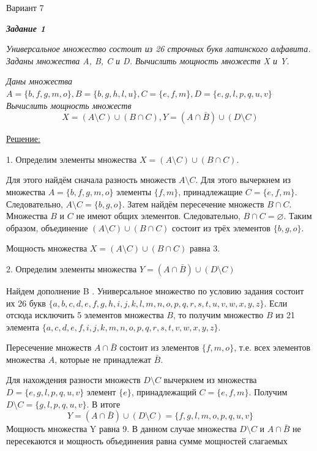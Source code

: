 \documentclass[11pt]{article}
\let\emptyset\varnothing
\begin{document}
        \begin{center}
        Вариант 7
        \end{center}

        \textit{\textbf{Задание 1}}

        \textit{Универсальное множество состоит из 26 строчных букв латинского
алфавита. Заданы множества A, B, C и D. Вычислить мощность множеств X
и Y.}

\textit{Даны множества
$A=\{b,f,g,m,o\}, B=\{b,g,h,l,u\}, C=\{e,f,m\}, D=\{e,g,l,p,q,u,v\}$\\
Вычислить мощность множеств}
$$X = (A \setminus C) \cup (B \cap C),
Y=(A \cap \bar B) \cup (D \setminus C) $$

\underline{Решение:}

1. Определим элементы множества 
$X = (A \setminus C) \cup (B \cap C)$.

Для этого найдём сначала разность множеств $A \setminus C$.
Для этого вычеркнем из множества $A=\{b,f,g,m,o\}$ элементы
$\{f, m\}$, принадлежащие $C=\{e,f,m\}$. Следовательно,
$A \setminus C = \{b, g, o\}$.
Затем найдём пересечение множеств $B \cap C$.
Множества $B$ и $C$ не имеют общих элементов. Следовательно,
$B \cap C = \emptyset$.
Таким образом, объединение $(A \setminus C) \cup (B \cap C)$ состоит из
трёх элементов $\{b, g, o\}$.

Мощность множества 
$X = (A \setminus C) \cup (B \cap C)$ равна 3.

2. Определим элементы множества 
$Y=(A \cap \bar B) \cup (D \setminus C)$

Найдем дополнение B . Универсальное множество по условию задания
состоит их 26 букв
$\{a,b,c,d,e,f,g,h,i,j,k,l,m,n,o,p,q,r,s,t,u,v,w,x,y,z\}$.
Если отсюда исключить 5 элементов множества $B$, то получим множество
$B$ из 21 элемента
$\{a,c,d,e,f,i,j,k,m,n,o,p,q,r,s,t,v,w,x,y,z\}$.

Пересечение множеств $A \cap \bar B$
состоит из элементов $\{f, m, o\}$, т.е. всех
элементов множества $A$, которые не принадлежат $\bar B$.

Для нахождения разности множеств $D \setminus C$ вычеркнем из множества
$D=\{e,g,l,p,q,u,v\}$
элемент $\{e\}$, принадлежащий
$C=\{e,f,m\}$. Получим
$D \setminus C = \{g, l, p, q, u, v\}$. В итоге\\
$$Y=(A \cap \bar B) \cup (D \setminus C) = \{f,g,l,m,o,p,q,u,v\}$$
Мощность множества Y равна 9. В данном случае множества $D \setminus C$
и $A \cap \bar B$ не пересекаются и мощность объединения равна
сумме мощностей слагаемых
\end{document}
